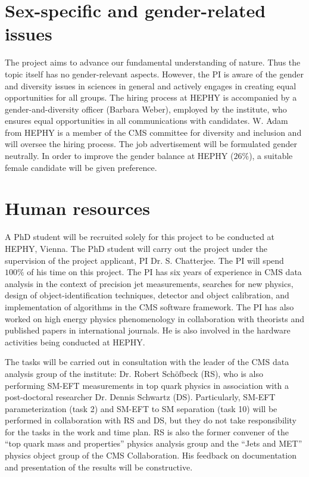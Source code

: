 \documentclass[a4paper,11pt]{article}
\begin{document}
\section{Sex-specific and gender-related issues}\label{sec:sex}
The project aims to advance our fundamental understanding of nature. 
Thus the topic itself has no gender-relevant aspects. 
However, the PI is aware of the gender and diversity issues in sciences in general and actively engages in creating equal opportunities for all groups. 
The hiring process at HEPHY is accompanied by a gender-and-diversity officer (Barbara Weber), employed by the institute, who ensures equal opportunities in all communications with candidates. 
W. Adam from HEPHY is a member of the CMS committee for diversity and inclusion and will oversee the hiring process. 
The job advertisement will be formulated gender neutrally. 
In order to improve the gender balance at HEPHY
($26\%$), a suitable female candidate will be given preference.

\section{Human resources}

A PhD student will be recruited solely for this project to be conducted at HEPHY, Vienna. 
The PhD student will carry out the project under the supervision of the project applicant, PI Dr. S. Chatterjee. 
The PI will spend $100\%$ of his time on this project. 
The PI has six years of experience in CMS data analysis in the context of precision jet measurements, searches for new physics, design of object-identification techniques, detector and object calibration, and implementation of algorithms in the CMS software framework. 
The PI has also worked on high energy physics phenomenology in collaboration with theorists and published papers in international journals. 
He is also involved in the hardware activities being conducted at HEPHY.%

The tasks will be carried out in consultation with the leader of the CMS data analysis group of the institute: Dr. Robert Sch{\"o}fbeck (RS), who is also performing SM-EFT measurements in top quark physics in association with a post-doctoral researcher Dr. Dennis Schwartz (DS). 
Particularly, SM-EFT parameterization (task 2) and SM-EFT to SM separation (task 10) will be performed in collaboration with RS and DS, but they do not take responsibility for the tasks in the work and time plan.
RS is also the former convener of the ``top quark mass and properties'' physics analysis group and the ``Jets and MET'' physics object group of the CMS Collaboration. 
His feedback on documentation and presentation of the results will be constructive. 
\end{document}
